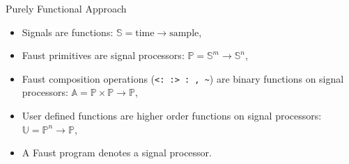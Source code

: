\begin{frame}[fragile]{Purely Functional Approach}
    \begin{itemize}
        \item Signals are functions: $\mathbb{S}=\mathrm{time}\rightarrow\mathrm{sample}$,
        \item Faust primitives are signal processors: $\mathbb{P}=\mathbb{S}^m\rightarrow\mathbb{S}^n$,
        \item Faust composition operations (\lstinline|<: :> : , ~|) are binary functions on signal processors: $\mathbb{A}=\mathbb{P}\times\mathbb{P}\rightarrow\mathbb{P}$,
        \item User defined functions are higher order functions on signal processors: $\mathbb{U}=\mathbb{P}^n\rightarrow\mathbb{P}$,
        \item A Faust program denotes a signal processor.
    \end{itemize}

\end{frame}
